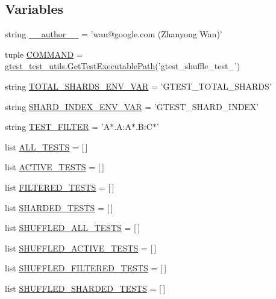 \subsection*{Variables}
\begin{DoxyCompactItemize}
\item 
string \hyperlink{namespacegtest__shuffle__test_a86e1668fd0984b5a9fccd0a2da540ad1}{\-\_\-\-\_\-author\-\_\-\-\_\-} = 'wan@google.\-com (Zhanyong Wan)'
\item 
tuple \hyperlink{namespacegtest__shuffle__test_a743518d873bfee85b04c5e87c27d60e1}{C\-O\-M\-M\-A\-N\-D} = \hyperlink{namespacegtest__test__utils_a1bdf3cac86afa675ed37629b183048e9}{gtest\-\_\-test\-\_\-utils.\-Get\-Test\-Executable\-Path}('gtest\-\_\-shuffle\-\_\-test\-\_\-')
\item 
string \hyperlink{namespacegtest__shuffle__test_a29088c2bb51a4550fa2a668d972f973a}{T\-O\-T\-A\-L\-\_\-\-S\-H\-A\-R\-D\-S\-\_\-\-E\-N\-V\-\_\-\-V\-A\-R} = 'G\-T\-E\-S\-T\-\_\-\-T\-O\-T\-A\-L\-\_\-\-S\-H\-A\-R\-D\-S'
\item 
string \hyperlink{namespacegtest__shuffle__test_ab3215c444f0e35ae2764f862194fe743}{S\-H\-A\-R\-D\-\_\-\-I\-N\-D\-E\-X\-\_\-\-E\-N\-V\-\_\-\-V\-A\-R} = 'G\-T\-E\-S\-T\-\_\-\-S\-H\-A\-R\-D\-\_\-\-I\-N\-D\-E\-X'
\item 
string \hyperlink{namespacegtest__shuffle__test_ac2a2a6c7c009be4f94bc9c8bc0c51bb5}{T\-E\-S\-T\-\_\-\-F\-I\-L\-T\-E\-R} = 'A$\ast$.A\-:\-A$\ast$.B\-:\-C$\ast$'
\item 
list \hyperlink{namespacegtest__shuffle__test_aede96442ff7a7c9ac9a8baaaeb48e86c}{A\-L\-L\-\_\-\-T\-E\-S\-T\-S} = \mbox{[}$\,$\mbox{]}
\item 
list \hyperlink{namespacegtest__shuffle__test_acd6d827819dcc06b9bf061cd4849b082}{A\-C\-T\-I\-V\-E\-\_\-\-T\-E\-S\-T\-S} = \mbox{[}$\,$\mbox{]}
\item 
list \hyperlink{namespacegtest__shuffle__test_a35011532d6bd14ac29c891111ce1a911}{F\-I\-L\-T\-E\-R\-E\-D\-\_\-\-T\-E\-S\-T\-S} = \mbox{[}$\,$\mbox{]}
\item 
list \hyperlink{namespacegtest__shuffle__test_ad9bd126c3dc9894a3977a907e97e71e8}{S\-H\-A\-R\-D\-E\-D\-\_\-\-T\-E\-S\-T\-S} = \mbox{[}$\,$\mbox{]}
\item 
list \hyperlink{namespacegtest__shuffle__test_a6128f9c522f40c64ffb3917ff17080b8}{S\-H\-U\-F\-F\-L\-E\-D\-\_\-\-A\-L\-L\-\_\-\-T\-E\-S\-T\-S} = \mbox{[}$\,$\mbox{]}
\item 
list \hyperlink{namespacegtest__shuffle__test_ac3bfd4eae8e6f35a83e73cfd9d9611d5}{S\-H\-U\-F\-F\-L\-E\-D\-\_\-\-A\-C\-T\-I\-V\-E\-\_\-\-T\-E\-S\-T\-S} = \mbox{[}$\,$\mbox{]}
\item 
list \hyperlink{namespacegtest__shuffle__test_aa9502dcb42a1d690d17558cc71388e45}{S\-H\-U\-F\-F\-L\-E\-D\-\_\-\-F\-I\-L\-T\-E\-R\-E\-D\-\_\-\-T\-E\-S\-T\-S} = \mbox{[}$\,$\mbox{]}
\item 
list \hyperlink{namespacegtest__shuffle__test_a3603885677e36438fd2d7521db51bcb4}{S\-H\-U\-F\-F\-L\-E\-D\-\_\-\-S\-H\-A\-R\-D\-E\-D\-\_\-\-T\-E\-S\-T\-S} = \mbox{[}$\,$\mbox{]}
\end{DoxyCompactItemize}



